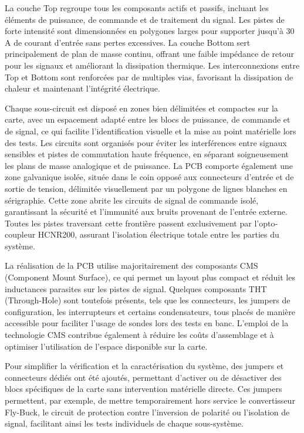La couche Top regroupe tous les composants actifs et passifs, incluant les éléments de puissance, de commande et de traitement du signal. Les pistes de forte intensité sont dimensionnées en polygones larges pour supporter jusqu'à 30 A de courant d'entrée sans pertes excessives. La couche Bottom sert principalement de plan de masse continu, offrant une faible impédance de retour pour les signaux et améliorant la dissipation thermique. Les interconnexions entre Top et Bottom sont renforcées par de multiples vias, favorisant la dissipation de chaleur et maintenant l'intégrité électrique.

Chaque sous-circuit est disposé en zones bien délimitées et compactes sur la carte, avec un espacement adapté entre les blocs de puissance, de commande et de signal, ce qui facilite l'identification visuelle et la mise au point matérielle lors des tests. Les circuits sont organisés pour éviter les interférences entre signaux sensibles et pistes de commutation haute fréquence, en séparant soigneusement les plans de masse analogique et de puissance. La PCB comporte également une zone galvanique isolée, située dans le coin opposé aux connecteurs d'entrée et de sortie de tension, délimitée visuellement par un polygone de lignes blanches en sérigraphie. Cette zone abrite les circuits de signal de commande isolé, garantissant la sécurité et l'immunité aux bruits provenant de l'entrée externe. Toutes les pistes traversant cette frontière passent exclusivement par l'opto­coupleur HCNR200, assurant l'isolation électrique totale entre les parties du système.

La réalisation de la PCB utilise majoritairement des composants CMS (Component Mount Surface), ce qui permet un layout plus compact et réduit les inductances parasites sur les pistes de signal. Quelques composants THT (Through-Hole) sont toutefois présents, tels que les connecteurs, les jumpers de configuration, les interrupteurs et certains condensateurs, tous placés de manière accessible pour faciliter l'usage de sondes lors des tests en banc. L'emploi de la technologie CMS contribue également à réduire les coûts d'assemblage et à optimiser l'utilisation de l'espace disponible sur la carte.

Pour simplifier la vérification et la caractérisation du système, des jumpers et connecteurs dédiés ont été ajoutés, permettant d'activer ou de désactiver des blocs spécifiques de la carte sans intervention matérielle directe. Ces jumpers permettent, par exemple, de mettre temporairement hors service le convertisseur Fly-Buck, le circuit de protection contre l'inversion de polarité ou l'isolation de signal, facilitant ainsi les tests individuels de chaque sous-système.

